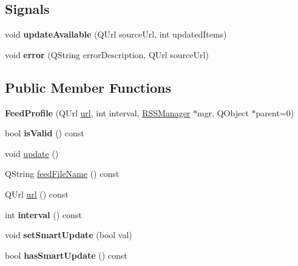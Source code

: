 \subsection*{Signals}
\begin{DoxyCompactItemize}
\item 
\hypertarget{class_feed_profile_a1c3709a1121dbba8b1917d8979f22b42}{void {\bfseries update\-Available} (Q\-Url source\-Url, int updated\-Items)}\label{class_feed_profile_a1c3709a1121dbba8b1917d8979f22b42}

\item 
\hypertarget{class_feed_profile_ab1775213426d8040bb399a7b2d30a58d}{void {\bfseries error} (Q\-String error\-Description, Q\-Url source\-Url)}\label{class_feed_profile_ab1775213426d8040bb399a7b2d30a58d}

\end{DoxyCompactItemize}
\subsection*{Public Member Functions}
\begin{DoxyCompactItemize}
\item 
\hypertarget{class_feed_profile_a422b9d62f1f12cfa2ccc0abff0bd9f46}{{\bfseries Feed\-Profile} (Q\-Url \hyperlink{class_feed_profile_a5f25604a765601d87e41b97adfd709e8}{url}, int interval, \hyperlink{class_r_s_s_manager}{R\-S\-S\-Manager} $\ast$mgr, Q\-Object $\ast$parent=0)}\label{class_feed_profile_a422b9d62f1f12cfa2ccc0abff0bd9f46}

\item 
\hypertarget{class_feed_profile_a637ca0acef3c1741351df0786b8f776d}{bool {\bfseries is\-Valid} () const }\label{class_feed_profile_a637ca0acef3c1741351df0786b8f776d}

\item 
void \hyperlink{class_feed_profile_ab6898094e5bbbff57329958000fb08cf}{update} ()
\item 
Q\-String \hyperlink{class_feed_profile_a4e8512cf50a4613d3f41bf040068b87d}{feed\-File\-Name} () const 
\item 
Q\-Url \hyperlink{class_feed_profile_a5f25604a765601d87e41b97adfd709e8}{url} () const 
\item 
\hypertarget{class_feed_profile_a529a23708eb27f5ab8e6f2e6ff30698f}{int {\bfseries interval} () const }\label{class_feed_profile_a529a23708eb27f5ab8e6f2e6ff30698f}

\item 
\hypertarget{class_feed_profile_ab416ef8e604ec3f4edc72a8cb5def28c}{void {\bfseries set\-Smart\-Update} (bool val)}\label{class_feed_profile_ab416ef8e604ec3f4edc72a8cb5def28c}

\item 
\hypertarget{class_feed_profile_ad87944960204991b590eb7324d11165d}{bool {\bfseries has\-Smart\-Update} () const }\label{class_feed_profile_ad87944960204991b590eb7324d11165d}

\end{DoxyCompactItemize}


